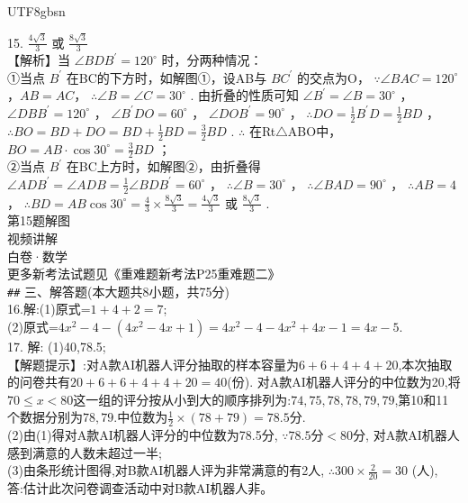 \begin{minipage}{\textwidth}
\begin{tcolorbox}
\begin{CJK*}{UTF8}{gbsn}
\begin{minipage}[t]{0.48\textwidth}
    15. $ \frac{4\sqrt{3}}{3} $ 或 $ \frac{8\sqrt{3}}{3} $ \\
    【解析】当 $ \angle B D B^{\prime}=120^{\circ} $ 时，分两种情况： \\
    ①当点 $ B^{\prime} $ 在BC的下方时，如解图①，设AB与 $ B C^{\prime} $ 的交点为O， $ \because \angle BAC=120^{\circ} $ ，$ AB=AC $， $ \therefore \angle B=\angle C=30^{\circ} $ . 由折叠的性质可知 $ \angle B^{\prime}=\angle B=30^{\circ} $ ， $ \angle D B B^{\prime}=120^{\circ} $ ， $ \angle B^{\prime} D O=60^{\circ} $ ， $ \angle D O B^{\prime}=90^{\circ} $ ， $ \therefore D O=\frac{1}{2}B^{\prime}D=\frac{1}{2}B D $ ， $ \therefore B O=B D+D O=B D+\frac{1}{2}B D=\frac{3}{2}B D $ . $ \therefore $ 在Rt$\triangle$ABO中，$ BO=AB\cdot\cos 30^{\circ}=\frac{3}{2}BD $ ； \\
    ②当点 $ B^{\prime} $ 在BC上方时，如解图②，由折叠得 $ \angle ADB^{\prime}=\angle ADB=\frac{1}{2}\angle BDB^{\prime}=60^{\circ} $ ， $ \therefore \angle B=30^{\circ} $ ， $ \therefore \angle BAD=90^{\circ} $ ， $ \therefore AB=4 $ ， $ \therefore BD=AB\cos 30^{\circ}=\frac{4}{3}\times\frac{8\sqrt{3}}{3}=\frac{4\sqrt{3}}{3} $ 或 $ \frac{8\sqrt{3}}{3} $ . \\[1.5ex]
    
    第15题解图 \\
    视频讲解 \\
    白卷·数学 \\
    更多新考法试题见《重难题新考法P25重难题二》 \\[1.5ex]
    
    \verb|##| 三、解答题(本大题共8小题，共75分) \\[0.5ex]
    
    16.解:(1)原式=$1+4+2=7$; \\
    (2)原式=$ 4x^{2}-4-(4x^{2}-4x+1)=4x^{2}-4-4x^{2}+4x-1=4x-5 $. \\[1.5ex]
    
    17. 解: (1)40,78.5; \\
    【解题提示】:对A款AI机器人评分抽取的样本容量为$6+6+4+4+20$,本次抽取的问卷共有$20+6+6+4+4+20=40$(份). 对A款AI机器人评分的中位数为20,将$70 \le x < 80$这一组的评分按从小到大的顺序排列为:$74,75,78,78,79,79$,第10和11个数据分别为$78,79$.中位数为$\frac{1}{2}\times(78+79)=78.5$分. \\
    (2)由(1)得对A款AI机器人评分的中位数为78.5分, $ \because 78.5 $分$ < 80 $分, 对A款AI机器人感到满意的人数未超过一半; \\
    (3)由条形统计图得,对B款AI机器人评为非常满意的有2人, $ \therefore 300\times\frac{2}{20}=30 $ (人), \\
    答:估计此次问卷调查活动中对B款AI机器人非。


\end{minipage}
\end{CJK*}
\end{tcolorbox}
\end{minipage}
